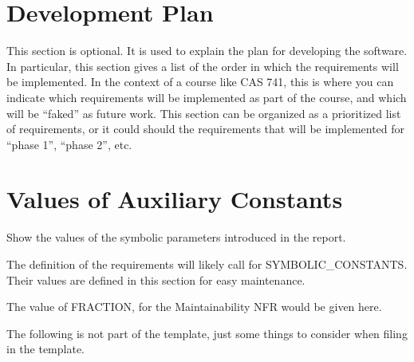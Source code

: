 \documentclass[12pt]{article}
\begin{document}



\section{Development Plan}

This section is optional.  It is used to explain the plan for developing the
software.  In particular, this section gives a list of the order in which the
requirements will be implemented.  In the context of a course like CAS 741, this
is where you can indicate which requirements will be implemented as part of the
course, and which will be ``faked'' as future work.  This section can be
organized as a prioritized list of requirements, or it could should the
requirements that will be implemented for ``phase 1'', ``phase 2'', etc.

\section{Values of Auxiliary Constants}

Show the values of the symbolic parameters introduced in the report.

The definition of the requirements will likely call for SYMBOLIC\_CONSTANTS.
Their values are defined in this section for easy maintenance.

The value of FRACTION, for the Maintainability NFR would be given here.

\newpage

\noindent The following is not part of the template, just some things to consider
  when filing in the template.
\end{document}
